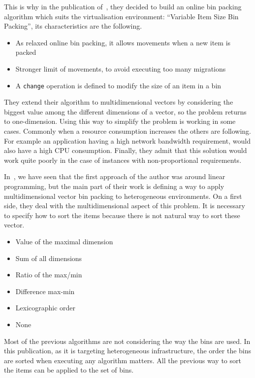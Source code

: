 This is why in the publication of~\cite*{reassignmentVisbp}, they decided to
build an online bin packing algorithm which suits the virtualisation
environment: “Variable Item Size Bin Packing”, its characteristics are the
following.

\begin{itemize}
	\item{As relaxed online bin packing, it allows movements when a new item is packed}
	\item{Stronger limit of movements, to avoid executing too many migrations}
	\item{A \texttt{change} operation is defined to modify the size of an item in a bin}
\end{itemize}

They extend their algorithm to multidimensional vectors by considering the biggest
value among the different dimensions of a vector, so the problem returns to
one-dimension. Using this way to simplify the problem is working in some cases.
Commonly when a resource consumption increases the others are following. For
example an application having a high network bandwidth requirement, would also have a
high CPU consumption. Finally, they admit that this solution would work quite poorly
in the case of instances with non-proportional requirements.

In~\cite{allocationHeterogeneous}, we have seen that the first approach of the author
was around linear programming, but the main part of their work is defining a way
to apply multidimensional vector bin packing to heterogeneous environments. On a first side,
they deal with the multidimensional aspect of this problem. It is necessary to specify how to
sort the items because there is not natural way to sort these vector.

\begin{itemize}
	\item Value of the maximal dimension
	\item Sum of all dimensions
	\item Ratio of the max/min
	\item Difference max-min
	\item Lexicographic order
	\item None
\end{itemize}

Most of the previous algorithms are not considering the way the bins are used.
In this publication, as it is targeting heterogeneous infrastructure, the order
the bins are sorted when executing any algorithm matters. All the previous way to
sort the items can be applied to the set of bins.


